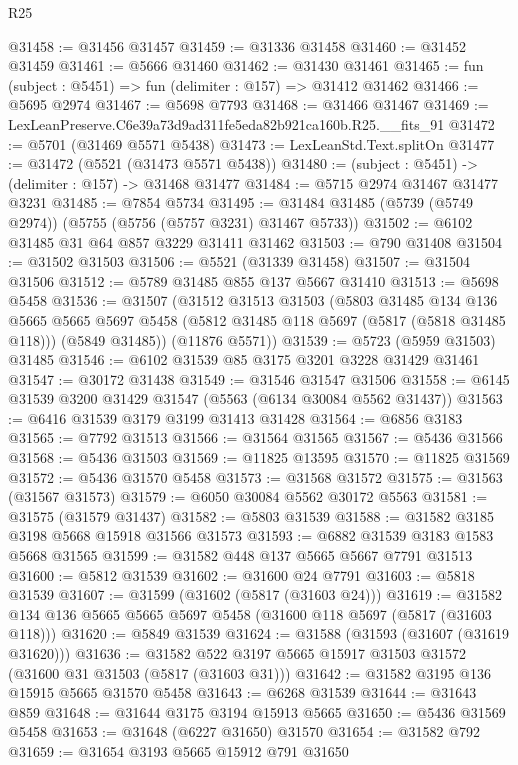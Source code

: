 \begin{lexlean}{R25}
\begin{coremodule}
@31458 := @31456 @31457
@31459 := @31336 @31458
@31460 := @31452 @31459
@31461 := @5666 @31460
@31462 := @31430 @31461
@31465 := fun (subject : @5451) => fun (delimiter : @157) => @31412 @31462
@31466 := @5695 @2974
@31467 := @5698 @7793
@31468 := @31466 @31467
@31469 := LexLeanPreserve.C6e39a73d9ad311fe5eda82b921ca160b.R25.__fits_91
@31472 := @5701 (@31469 @5571 @5438)
@31473 := LexLeanStd.Text.splitOn
@31477 := @31472 (@5521 (@31473 @5571 @5438))
@31480 := (subject : @5451) -> (delimiter : @157) -> @31468 @31477
@31484 := @5715 @2974 @31467 @31477 @3231
@31485 := @7854 @5734
@31495 := @31484 @31485 (@5739 (@5749 @2974)) (@5755 (@5756 (@5757 @3231) @31467 @5733))
@31502 := @6102 @31485 @31 @64 @857 @3229 @31411 @31462
@31503 := @790 @31408
@31504 := @31502 @31503
@31506 := @5521 (@31339 @31458)
@31507 := @31504 @31506
@31512 := @5789 @31485 @855 @137 @5667 @31410
@31513 := @5698 @5458
@31536 := @31507
    (@31512
      @31513
      @31503
      (@5803
        @31485
        @134
        @136
        @5665
        @5665
        @5697
        @5458
        (@5812 @31485 @118 @5697 (@5817 (@5818 @31485 @118)))
        (@5849 @31485))
      (@11876 @5571))
@31539 := @5723 (@5959 @31503) @31485
@31546 := @6102 @31539 @85 @3175 @3201 @3228 @31429 @31461
@31547 := @30172 @31438
@31549 := @31546 @31547 @31506
@31558 := @6145 @31539 @3200 @31429 @31547 (@5563 (@6134 @30084 @5562 @31437))
@31563 := @6416 @31539 @3179 @3199 @31413 @31428
@31564 := @6856 @3183
@31565 := @7792 @31513
@31566 := @31564 @31565
@31567 := @5436 @31566
@31568 := @5436 @31503
@31569 := @11825 @13595
@31570 := @11825 @31569
@31572 := @5436 @31570 @5458
@31573 := @31568 @31572
@31575 := @31563 (@31567 @31573)
@31579 := @6050 @30084 @5562 @30172 @5563
@31581 := @31575 (@31579 @31437)
@31582 := @5803 @31539
@31588 := @31582 @3185 @3198 @5668 @15918 @31566 @31573
@31593 := @6882 @31539 @3183 @1583 @5668 @31565
@31599 := @31582 @448 @137 @5665 @5667 @7791 @31513
@31600 := @5812 @31539
@31602 := @31600 @24 @7791
@31603 := @5818 @31539
@31607 := @31599 (@31602 (@5817 (@31603 @24)))
@31619 := @31582 @134 @136 @5665 @5665 @5697 @5458 (@31600 @118 @5697 (@5817 (@31603 @118)))
@31620 := @5849 @31539
@31624 := @31588 (@31593 (@31607 (@31619 @31620)))
@31636 := @31582 @522 @3197 @5665 @15917 @31503 @31572 (@31600 @31 @31503 (@5817 (@31603 @31)))
@31642 := @31582 @3195 @136 @15915 @5665 @31570 @5458
@31643 := @6268 @31539
@31644 := @31643 @859
@31648 := @31644 @3175 @3194 @15913 @5665
@31650 := @5436 @31569 @5458
@31653 := @31648 (@6227 @31650) @31570
@31654 := @31582 @792
@31659 := @31654 @3193 @5665 @15912 @791 @31650

\end{coremodule}
\end{lexlean}
